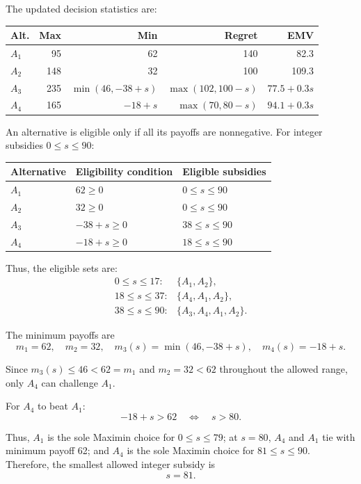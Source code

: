The updated decision statistics are:

\begin{center}\small\setlength{\tabcolsep}{4pt}
	\begin{tabular}{lrrrr}\toprule
		Alt. & Max & Min & Regret & EMV\\ \midrule
				$A_1$ & 95 & 62 & 140 & 82.3\\
		$A_2$ & 148 & 32 & 100 & 109.3\\
		$A_3$ & 235 & $\min(46,-38+s)$ & $\max(102,100-s)$ & $77.5+0.3s$\\
		$A_4$ & 165 & $-18+s$ & $\max(70,80-s)$ & $94.1+0.3s$\\
		\bottomrule
	\end{tabular}
\end{center}

An alternative is eligible only if all its payoffs are nonnegative.
For integer subsidies $0\le s\le90$:

\begin{center}
\begin{tabular}{lll}\toprule
Alternative & Eligibility condition & Eligible subsidies\\\midrule
$A_1$ & $62\ge0$ & $0\le s\le90$\\
$A_2$ & $32\ge0$ & $0\le s\le90$\\
$A_3$ & $-38+s\ge0$ & $38\le s\le90$\\
$A_4$ & $-18+s\ge0$ & $18\le s\le90$\\
\bottomrule
\end{tabular}
\end{center}

Thus, the eligible sets are:
\[
\begin{array}{ll}
0\le s\le17: & \{A_1,A_2\},\\
18\le s\le37: & \{A_4,A_1,A_2\},\\
38\le s\le90: & \{A_3,A_4,A_1,A_2\}.
\end{array}
\]

The minimum payoffs are
\[
m_1=62,\quad m_2=32,\quad
m_3(s)=\min(46,-38+s),\quad m_4(s)=-18+s.
\]

Since $m_3(s)\le46<62=m_1$ and $m_2=32<62$ throughout
the allowed range, only $A_4$ can challenge $A_1$.

For $A_4$ to beat $A_1$:
\[
-18+s>62
\quad\Longleftrightarrow\quad s>80.
\]

Thus, $A_1$ is the sole Maximin choice for $0\le s\le79$;
at $s=80$, $A_4$ and $A_1$ tie with minimum payoff 62;
and $A_4$ is the sole Maximin choice for $81\le s\le90$.
Therefore, the smallest allowed integer subsidy is
\[
\boxed{s=81}.
\]

